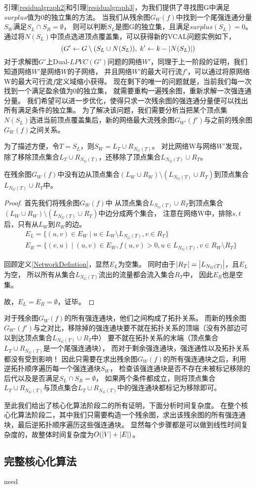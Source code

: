 引理\ref{residualgraph2}和引理\ref{residualgraph3}，为我们提供了寻找图G中满足$surplus$值为0的独立集的方法。
当我们从残余图$G_W(f)$中找到一个尾强连通分量$S_W$满足$S_L \cap S_R = \emptyset$，
则可以判断$S_L$是图G的独立集，且满足$surplus(S_L) = 0$。
通过将$N(S_L)$中顶点选进顶点覆盖集，可以获得新的VCAL问题实例如下，
\[(G' \leftarrow G \setminus (S_L \cup N(S_L)),\; k' \leftarrow k - \left\vert N(S_L) \right\vert)\]
对于求解图$G'$上Dual-$LPVC(G')$问题的网络$W'$，同理于上一阶段的证明，我们知道网络$W'$是网络$W$的子网络，
并且网络$W'$的最大可行流$f'$，可以通过将原网络W的最大可行流$f$定义域缩小获得。
现在剩下的唯一的问题就是，当前我们每一次找到一个满足盈余值为0的独立集，
就需要重构一遍残余图，重新求解一次强连通分量。
我们希望可以进一步优化，使得只求一次残余图的强连通分量便可以找出所有满足条件的独立集。
为了解决该问题，我们需要分析当把某个顶点集$N(S_L)$选进当前顶点覆盖集后，新的网络最大流残余图$G_{W'}(f')$与之前的残余图$G_W(f)$之间关系。

为了描述方便，令$T = S_L$，则$S_W = L_T \cup R_{N_G(T)}$。
对比网络W与网络$W'$发现，除了移除顶点集合$L_T \cup R_{N_G(T)}$，还移除了顶点集合$L_{N_G(T)} \cup R_T$。

\begin{claim}
在残余图$G_W(f)$中没有边从顶点集合$(L_W \cup R_W) \setminus (L_{N_G(T)} \cup R_T)$到顶点集合$L_{N_G(T)} \cup R_T$中。
\end{claim}
\begin{proof}
首先我们将残余图$G_W(f)$中
从顶点集合$L_{N_G(T)} \cup R_T$到顶点集合$(L_W \cup R_W) \setminus (L_{N_G(T)} \cup R_T)$中边分成两个集合，
注意在网络W中，排除$s, t$后，只有从$L_W$到$R_W$的边。
  \begin{equation*} \begin{aligned}
    & E_L = \{(u, v) \in E_W\;|\;u \in L_W \setminus L_{N_G(T)},v \in R_T\} \\
    & E_R = \{(v, u)\;|\;(u, v) \in E_W,f(u, v) > 0,u \in L_{N_G(T)},v \in R_W \setminus R_T\}
  \end{aligned} \end{equation*}
  
回顾定义\ref{NetworkDefintion}，显然$E_L$为空集。
同时由于$\left\vert R_T \right\vert = \left\vert L_{N_G(T)} \right\vert$，且$E_L$为空，
所以所有从集合$L_{N_G(T)}$流出的流量都会流入集合$R_T$中，
因此$E_R$也是空集。

故，$E_L = E_R = \emptyset$，证毕。
\end{proof}

对于残余图$G_W(f)$的所有强连通块，他们之间构成了拓扑关系。
而新的残余图$G_{W'}(f')$与之对比，移除掉的强连通块要不就在拓扑关系的顶端（没有外部边可以到达顶点集合$L_{N_G(T)} \cup R_T$中）
要不就在拓扑关系的末端（顶点集合$L_T \cup R_{N_G(T)}$是一个尾强连通块），
而对于剩余强连通块，强连通性以及拓扑关系都没有受到影响！
因此只需要在求出残余图$G_W(f)$的所有强连通块之后，利用逆拓扑顺序遍历每一个强连通块$S_W$，
检查该强连通块是否不存在未被标记移除的后代以及是否满足$S_L \cap S_R = \emptyset$，
如果两个条件都成立，则将顶点集合$L_T \cup R_{N_G(T)}$与顶点集合$L_T \cup R_{N_G(T)}$中的强连通块都标记为移除即可。

至此我们给出了核心化算法阶段二的所有证明，下面分析时间复杂度。
在整个核心化算法阶段二，其中我们只需要构造一个残余图，求出该残余图的所有强连通块，最后逆拓扑顺序遍历这些强连通块。
显然每个步骤都是可以做到线性时间复杂度的，故整体时间复杂度为$O(\left\vert V \right\vert + \left\vert E \right\vert)$。

\subsection{完整核心化算法}
\textcolor[rgb]{1.00,0.00,0.00}{need} 